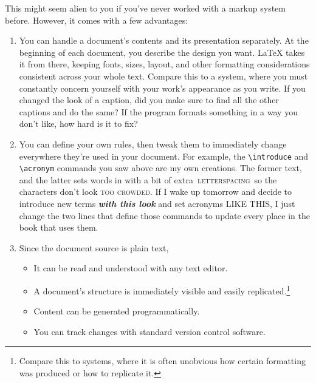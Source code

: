 This might seem alien to you if you've never worked with a markup system before.
However, it comes with a few advantages:
\begin{enumerate}
\item You can handle a document's contents and its presentation separately.
    At the beginning of each document,
    you describe the design you want.
    \LaTeX{} takes it from there,
    keeping fonts, sizes, layout,
    and other formatting considerations consistent across your
    whole text.
    Compare this to a  system,
    where you must constantly concern yourself with your work's appearance
    as you write.
    If you changed the look of a caption,
    did you make sure to find all the other captions and do the
    same?
    If the program formats something in a way you don't like,
    how hard is it to fix?%

\item You can define your own rules, then tweak them to immediately change
    everywhere they're used in your document.
    For example, the \verb|\introduce| and \verb|\acronym| commands you saw above
    are my own creations. The former  text, and
    the latter sets words in  with a bit of extra
    \,\textsc{letterspacing}\, so the characters
    don't look \textsc{too crowded}.
    If I wake up tomorrow and decide to introduce new terms
    \textbf{\itshape with this look} and set acronyms
    {\small{} LIKE THIS},
    I just change the two lines that define those commands
    to update every place in the book that uses them.

\clearpage
\item Since the document source is plain text,
    \begin{itemize}
    \item It can be read and understood with any text editor.
    \item A document's structure is immediately visible
        and easily replicated.\punckern\footnote{Compare this to
         systems, where it is often unobvious
        how certain formatting was produced or how to replicate it.}
    \item Content can be generated programmatically.
    \item You can track changes with standard version control software.
    \end{itemize}
\end{enumerate}

